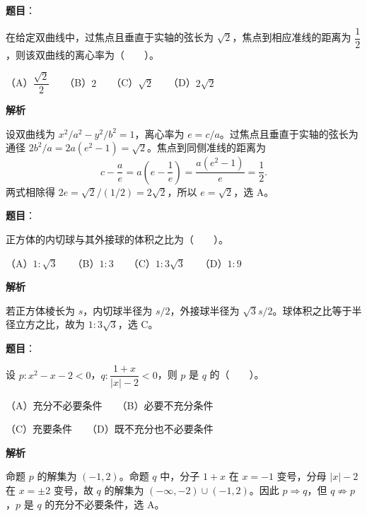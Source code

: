 \begin{answer}

\textbf{题目}：

在给定双曲线中，过焦点且垂直于实轴的弦长为 $\sqrt2$，焦点到相应准线的距离为 $\dfrac12$，则该双曲线的离心率为\mbox{（　　）}。

（A）$\dfrac{\sqrt2}{2}$　　（B）$2$　　（C）$\sqrt2$　　（D）$2\sqrt2$

\textbf{解析}

设双曲线为 $x^2/a^2-y^2/b^2=1$，离心率为 $e=c/a$。过焦点且垂直于实轴的弦长为通径 $2b^2/a=2a(e^2-1)=\sqrt2$。焦点到同侧准线的距离为
\nopagebreak[4]
\[
c-\frac{a}{e}=a\left(e-\frac1e\right)=\frac{a(e^2-1)}e=\frac12.
\]
两式相除得 $2e=\sqrt2/(1/2)=2\sqrt2$，所以 $e=\sqrt2$，选 A。


\end{answer}
\begin{answer}

\textbf{题目}：

正方体的内切球与其外接球的体积之比为\mbox{（　　）}。

（A）$1:\sqrt3$　　（B）$1:3$　　（C）$1:3\sqrt3$　　（D）$1:9$

\textbf{解析}

若正方体棱长为 $s$，内切球半径为 $s/2$，外接球半径为 $\sqrt3s/2$。球体积之比等于半径立方之比，故为 $1:3\sqrt3$，选 C。


\end{answer}
\begin{answer}

\textbf{题目}：

设 $p\colon x^2-x-2<0$，$q\colon\dfrac{1+x}{|x|-2}<0$，则 $p$ 是 $q$ 的\mbox{（　　）}。

（A）充分不必要条件　　（B）必要不充分条件

（C）充要条件　　（D）既不充分也不必要条件

\textbf{解析}

命题 $p$ 的解集为 $(-1,2)$。命题 $q$ 中，分子 $1+x$ 在 $x=-1$ 变号，分母 $|x|-2$ 在 $x=\pm2$ 变号，故 $q$ 的解集为 $(-\infty,-2)\cup(-1,2)$。因此 $p\Rightarrow q$，但 $q\not\Rightarrow p$，$p$ 是 $q$ 的充分不必要条件，选 A。


\end{answer}
